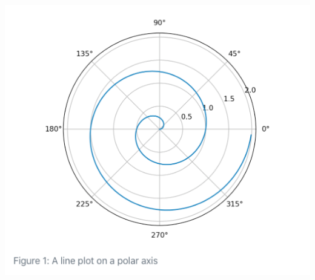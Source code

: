 \documentclass[
  letterpaper,
  DIV=11,
  numbers=noendperiod]{scrartcl}
\begin{document}
\includegraphics[width=6.77083in,height=\textheight]{images/polar-axis.png}
\end{document}

